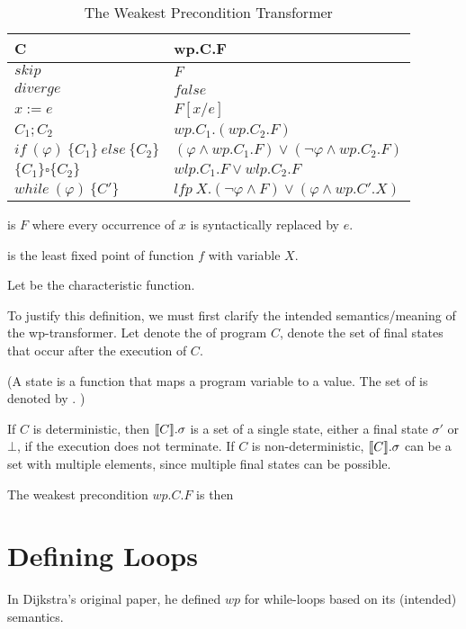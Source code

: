 \begin{table}[h!]\centering
    \begin{tabular}{ll}
      \textbf{C}&\textbf{wp.C.F}    \\ \hline
      $skip$&   $F$   \\
      $diverge$&  $false$\\
      $x:= e $&  $F[x/e]$\\
      $C_1;C_2$&  $wp.C_1.(wp.C_2.F)$\\
      $if\ (\varphi)\ \{C_1\}\ else\ \{C_2\} $&  $(\varphi\wedge wp.C_1.F)\vee(\neg\varphi\wedge wp.C_2.F)$\\
      $\{C_1\}\square \{C_2\}$ & $wlp.C_1.F\vee wlp.C_2.F$ \\
      $while\ (\varphi)\ \{C'\}$&  $lfp\ X.(\neg\varphi\wedge F)\vee(\varphi\wedge wp.C'.X)$\\
    \end{tabular}
    \caption{The Weakest Precondition Transformer}
\end{table}

 is $F$ where every occurrence of $x$ is syntactically replaced by $e$. 

 is the least fixed point of function $f$ with variable $X$. 

Let  be the characteristic function. 

To justify this definition, we must first clarify the intended semantics/meaning of the wp-transformer. 
Let  denote the  of program $C$,  denote the set of final states that  occur after the execution of $C$. 

(A state is a function that maps a program variable to a value. The set of  is denoted by . )

If $C$ is deterministic, then $\llbracket {C} \rrbracket.\sigma$ is a set of a single state, either a final state $\sigma'$ or $\bot$, if the execution does not terminate. 
If $C$ is non-deterministic, $\llbracket {C} \rrbracket.\sigma$ can be a set with multiple elements, since multiple final states can be possible. 

The weakest precondition $wp.C.F$ is then 


\section{Defining Loops}
In Dijkstra's original paper\cite{Dijkstra1975}, he defined $wp$ for while-loops based on its (intended) semantics. 

